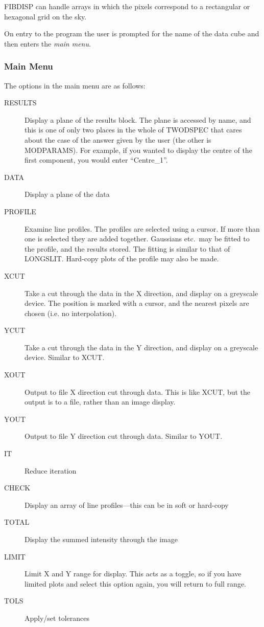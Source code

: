 FIBDISP can handle arrays in which the pixels correspond to a
rectangular or hexagonal grid on the sky.

On entry to the program the user is prompted for the name of the data
cube and then enters the {\em main menu}.

\subsubsection{Main Menu}

The options in the main menu are as follows:
\begin{description}
\item[RESULTS] Display a plane of the results block.
The plane is accessed by name, and this is one of only two places in the
whole of TWODSPEC that cares about the case of the answer given by the
user (the other is MODPARAMS).
For example, if you wanted to display the centre of the first component,
you would enter ``Centre\_1''.
\item[DATA] Display a plane of the data
\item[PROFILE] Examine line profiles.
The profiles are selected using a cursor.
If more than one is selected they are added together. Gaussians  etc.\
may be fitted to the profile, and the results stored.
The fitting is similar to that of LONGSLIT.
Hard-copy plots of the profile may also be made.
\item[XCUT] Take a cut through the data in the X direction, and
display on a greyscale device.
The position is marked with a cursor, and the nearest pixels are chosen
(i.e. no interpolation).
\item[YCUT] Take a cut through the data in the Y direction, and
display on a greyscale device.
Similar to XCUT.
\item[XOUT] Output to file X direction cut through data.
This is like XCUT, but the output is to a file, rather than an image
display.
\item[YOUT] Output to file Y direction cut through data.
Similar to YOUT.
\item[IT] Reduce iteration
\item[CHECK] Display an array of line profiles---this can be in soft
or hard-copy
\item[TOTAL] Display the summed intensity through the image
\item[LIMIT] Limit X and Y range for display.
This acts as a toggle, so if you have limited plots and select this
option again, you will return to full range.
\item[TOLS] Apply/set tolerances

\end{description}
